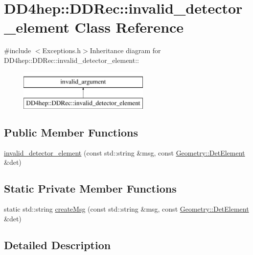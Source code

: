 \hypertarget{class_d_d4hep_1_1_d_d_rec_1_1invalid__detector__element}{
\section{DD4hep::DDRec::invalid\_\-detector\_\-element Class Reference}
\label{class_d_d4hep_1_1_d_d_rec_1_1invalid__detector__element}
}


{\ttfamily \#include $<$Exceptions.h$>$}Inheritance diagram for DD4hep::DDRec::invalid\_\-detector\_\-element::\begin{figure}[H]
\begin{center}
\leavevmode
\includegraphics[height=2cm]{class_d_d4hep_1_1_d_d_rec_1_1invalid__detector__element}
\end{center}
\end{figure}
\subsection*{Public Member Functions}
\begin{DoxyCompactItemize}
\item 
\hyperlink{class_d_d4hep_1_1_d_d_rec_1_1invalid__detector__element_af05d70f474fba21d10072fd98971f55e}{invalid\_\-detector\_\-element} (const std::string \&msg, const \hyperlink{class_d_d4hep_1_1_geometry_1_1_det_element}{Geometry::DetElement} \&det)
\end{DoxyCompactItemize}
\subsection*{Static Private Member Functions}
\begin{DoxyCompactItemize}
\item 
static std::string \hyperlink{class_d_d4hep_1_1_d_d_rec_1_1invalid__detector__element_a8e490d00933ab26fc58cac741958ac50}{createMsg} (const std::string \&msg, const \hyperlink{class_d_d4hep_1_1_geometry_1_1_det_element}{Geometry::DetElement} \&det)
\end{DoxyCompactItemize}


\subsection{Detailed Description}


